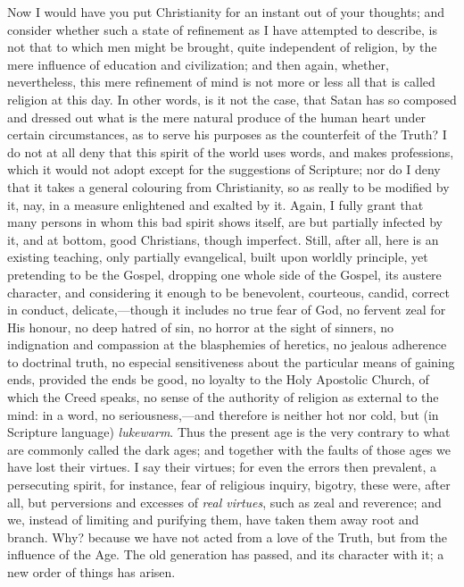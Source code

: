 Now I would have you put Christianity for an instant
out of your thoughts; and consider whether such a state
of refinement as I have attempted to describe, is not
that to which men might be brought, quite independent of
religion, by the mere influence of education and
civilization; and then again, whether, nevertheless, this
mere refinement of mind is not more or less all that is
called religion at this day. In other words, is it not
the case, that Satan has so composed and dressed out what
is the mere natural produce of the human heart under
certain circumstances, as to serve his purposes as the
counterfeit of the Truth? I do not at all deny that this
spirit of the world uses words, and makes professions,
which it would not adopt except for the suggestions of
Scripture; nor do I deny that it takes a general
colouring from Christianity, so as really to be modified
by it, nay, in a measure enlightened and exalted by it.
Again, I fully grant that many persons in whom this bad
spirit shows itself, are but partially infected by it,
and at bottom, good Christians, though imperfect. Still,
after all, here is an existing teaching, only partially
evangelical, built upon worldly principle, yet pretending
to be the Gospel, dropping one whole side of the Gospel,
its austere character, and considering it enough to be
benevolent, courteous, candid, correct in conduct,
delicate,—though it includes no true fear of God, no
fervent zeal for His honour, no deep hatred of sin, no
horror at the sight of sinners, no indignation and
compassion at the blasphemies of heretics, no jealous
adherence to doctrinal truth, no especial sensitiveness
about the particular means of gaining ends, provided the
ends be good, no loyalty to the Holy Apostolic Church, of
which the Creed speaks, no sense of the authority of
religion as external to the mind: in a word, no
seriousness,—and therefore is neither hot nor cold,
but (in Scripture language) \emph{lukewarm}. Thus the
present age is the very contrary to what are commonly
called the dark ages; and together with the faults of
those ages we have lost their virtues. I say their
virtues; for even the errors then prevalent, a
persecuting spirit, for instance, fear of religious
inquiry, bigotry, these were, after all, but perversions
and excesses of \emph{real virtues}, such as zeal and
reverence; and we, instead of limiting and purifying
them, have taken them away root and branch. Why? because
we have not acted from a love of the Truth, but from the
influence of the Age. The old generation has passed, and
its character with it; a new order of things has arisen.

